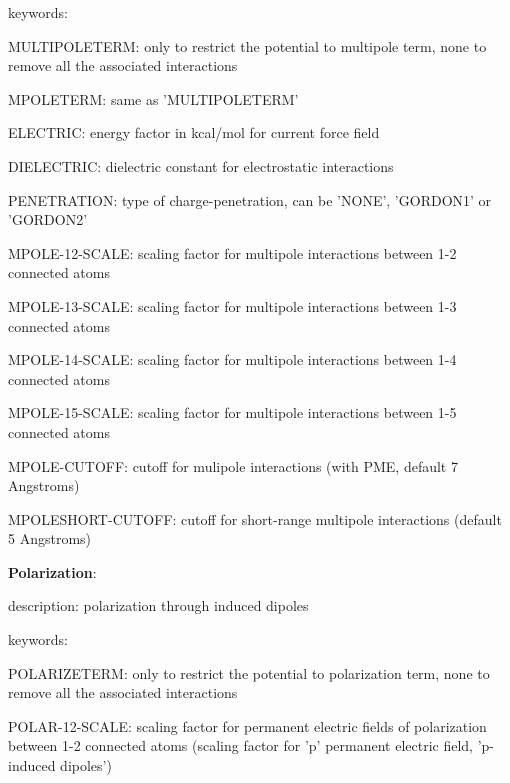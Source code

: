 \begin{DoxyItemize}
\begin{DoxyItemize}
\item keywords\-:
\begin{DoxyItemize}
\item M\-U\-L\-T\-I\-P\-O\-L\-E\-T\-E\-R\-M\-: only to restrict the potential to multipole term, none to remove all the associated interactions
\item M\-P\-O\-L\-E\-T\-E\-R\-M\-: same as 'M\-U\-L\-T\-I\-P\-O\-L\-E\-T\-E\-R\-M'
\item E\-L\-E\-C\-T\-R\-I\-C\-: energy factor in kcal/mol for current force field
\item D\-I\-E\-L\-E\-C\-T\-R\-I\-C\-: dielectric constant for electrostatic interactions
\item P\-E\-N\-E\-T\-R\-A\-T\-I\-O\-N\-: type of charge-\/penetration, can be 'N\-O\-N\-E', 'G\-O\-R\-D\-O\-N1' or 'G\-O\-R\-D\-O\-N2'
\item M\-P\-O\-L\-E-\/12-\/\-S\-C\-A\-L\-E\-: scaling factor for multipole interactions between 1-\/2 connected atoms
\item M\-P\-O\-L\-E-\/13-\/\-S\-C\-A\-L\-E\-: scaling factor for multipole interactions between 1-\/3 connected atoms
\item M\-P\-O\-L\-E-\/14-\/\-S\-C\-A\-L\-E\-: scaling factor for multipole interactions between 1-\/4 connected atoms
\item M\-P\-O\-L\-E-\/15-\/\-S\-C\-A\-L\-E\-: scaling factor for multipole interactions between 1-\/5 connected atoms
\item M\-P\-O\-L\-E-\/\-C\-U\-T\-O\-F\-F\-: cutoff for mulipole interactions (with P\-M\-E, default 7 Angstroms)
\item M\-P\-O\-L\-E\-S\-H\-O\-R\-T-\/\-C\-U\-T\-O\-F\-F\-: cutoff for short-\/range multipole interactions (default 5 Angstroms)
\end{DoxyItemize}
\end{DoxyItemize}
\item {\bfseries Polarization}\-:
\begin{DoxyItemize}
\item description\-: polarization through induced dipoles
\item keywords\-:
\begin{DoxyItemize}
\item P\-O\-L\-A\-R\-I\-Z\-E\-T\-E\-R\-M\-: only to restrict the potential to polarization term, none to remove all the associated interactions
\item P\-O\-L\-A\-R-\/12-\/\-S\-C\-A\-L\-E\-: scaling factor for permanent electric fields of polarization between 1-\/2 connected atoms (scaling factor for 'p' permanent electric field, 'p-\/induced dipoles')

\end{DoxyItemize}
\end{DoxyItemize}
\end{DoxyItemize}

